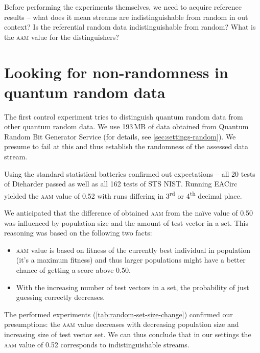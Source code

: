 \documentclass[12pt,oneside]{fithesis2}
\newcommand{\squarebullet}{\textcolor{black}{\raisebox{0.15em}{\rule{4pt}{4pt}}}}
\newenvironment{myItemize}{
  \begin{itemize}[leftmargin=2em,rightmargin=1em,itemsep=\parskip ,parsep=0em,topsep=0em,partopsep=0em]
  \renewcommand{\labelitemi}{\squarebullet}
  \renewcommand{\labelitemii}{$\diamond$}
}{
  \end{itemize}
}
\begin{document}
Before performing the experiments themselves, we need to acquire reference results -- what does it mean
streams are indistinguishable from random in out context? Is the referential random data indistinguishable from random?
What is the \textsc{aam} value for the distinguishers?

\section{Looking for non-randomness in quantum random data}
\label{sec:control-random-random}

The first control experiment tries to distinguish quantum random data from other quantum random data.
We use 193\,MB of data obtained from Quantum Random Bit Generator Service (for details, see \autoref{sec:settings-random}).
We presume to fail at this and thus establish the randomness of the assessed data stream.

Using the standard statistical batteries confirmed out expectations -- all 20 tests of Dieharder passed as well as
all 162 tests of STS NIST. Running EACirc yielded the \textsc{aam} value of 0.52 with runs differing in 3\textsuperscript{rd}
or 4\textsuperscript{th} decimal place.

We anticipated that the difference of obtained \textsc{aam} from the naïve value of 0.50 was influenced by population size
and the amount of test vector in a set. This reasoning was based on the following two facts:
\begin{myItemize}
\item \textsc{aam} value is based on fitness of the currently best individual in population (it's a maximum fitness) and thus
larger populations might have a better chance of getting a score above 0.50.
\item With the increasing number of test vectors in a set, the probability of just guessing correctly decreases.
\end{myItemize}

\noindent
The performed experiments (\autoref{tab:random-set-size-change}) confirmed our presumptions: the \textsc{aam} value decreases
with decreasing population size and increasing size of test vector set. We can thus conclude that in our settings the \textsc{aam}
value of 0.52 corresponds to indistinguishable streams.
\end{document}
